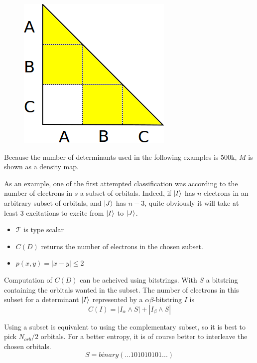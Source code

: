 \documentclass[./thesis.tex]{subfiles}
\begin{document}
\begin{figure}[h!]
	\begin{center}
		\includegraphics[width=0.4\columnwidth]{figures/davidson/disconnected_classes}
		\caption{{\label{generators_selectors}
		}}
	\end{center}
\end{figure}

Because the number of determinants used in the following examples is 500k, $M$ is shown as a density map.

As an example, one of the first attempted classification was according to the number of electrons in $s$ a subset of orbitals. Indeed, if $\ket I$ has $n$ electrons in an arbitrary subset of orbitals, and $\ket J$ has $n-3$, quite obviously it will take at least 3 excitations to excite from $\ket I$ to $\ket J$.
\begin{itemize}
	\item
	$\mathcal{T}$ is type scalar
	\item
	$C(D)$ returns the number of electrons in the chosen subset.
	\item
	$p(x, y) = |x-y| \leq 2$
\end{itemize}

Computation of $C(D)$ can be acheived using bitstrings. With $S$ a bitstring containing the orbitals wanted in the subset. The number of electrons in this subset for a determinant $\ket I$ represented by a $\alpha \beta$-bitstring $I$ is
\begin{equation}
C(I)=|I_{\alpha} \wedge S|+|I_{\beta} \wedge S|
\end{equation}

Using a subset is equivalent to using the complementary subset, so it is best to pick $N_{orb}/2$ orbitals. For a better entropy, it is of course better to interleave the chosen orbitals.
\begin{equation}
S=binary(...101010101...)
\end{equation}
    
\end{document}

